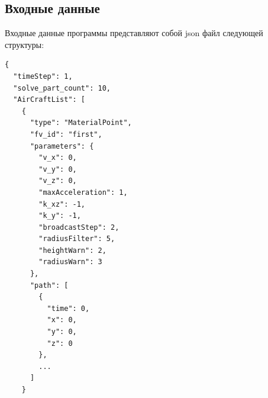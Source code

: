 \documentclass[a4paper,12pt]{article}
\numberwithin{figure}{subsubsection}
\begin{document}
\subsection{Входные данные}
Входные данные программы представляют собой json файл следующей структуры:
\begin{verbatim}
{
  "timeStep": 1,
  "solve_part_count": 10,
  "AirCraftList": [
    {
      "type": "MaterialPoint",
      "fv_id": "first",
      "parameters": {
        "v_x": 0,
        "v_y": 0,
        "v_z": 0,
        "maxAcceleration": 1,
        "k_xz": -1,
        "k_y": -1,
        "broadcastStep": 2,
        "radiusFilter": 5,
        "heightWarn": 2,
        "radiusWarn": 3
      },
      "path": [
        {
          "time": 0,
          "x": 0,
          "y": 0,
          "z": 0
        },
        ...
      ]
    }
\end{verbatim}
\end{document}
